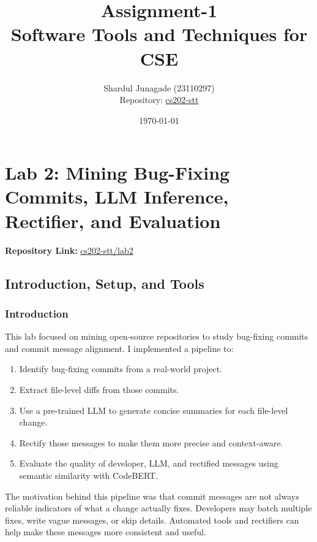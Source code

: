 \documentclass[10pt,a4paper]{report}
\title{\Huge Assignment-1 \\[0.5cm] \LARGE Software Tools and Techniques for CSE}
\author{\Large Shardul Junagade (23110297) \\[0.2cm] \Large Repository: \href{https://github.com/ShardulJunagade/cs202-stt}{cs202-stt}}
\date{\large \today}
\begin{document}
\maketitle
\newpage

\tableofcontents
\newpage



\chapter{Lab 2: Mining Bug-Fixing Commits, LLM Inference, Rectifier, and Evaluation}

\textbf{Repository Link:} \href{https://github.com/ShardulJunagade/cs202-stt/tree/main/lab2}{cs202-stt/lab2}

\section{Introduction, Setup, and Tools}

\subsection{Introduction}
This lab focused on mining open-source repositories to study bug-fixing commits and commit message alignment. I implemented a pipeline to:
\begin{enumerate}[itemsep=0.05em, topsep=0pt]
    \item Identify bug-fixing commits from a real-world project.
    \item Extract file-level diffs from those commits.
    \item Use a pre-trained LLM to generate concise summaries for each file-level change.
    \item Rectify those messages to make them more precise and context-aware.
    \item Evaluate the quality of developer, LLM, and rectified messages using semantic similarity with CodeBERT.
\end{enumerate}

The motivation behind this pipeline was that commit messages are not always reliable indicators of what a change actually fixes. Developers may batch multiple fixes, write vague messages, or skip details. Automated tools and rectifiers can help make these messages more consistent and useful.
\end{document}
